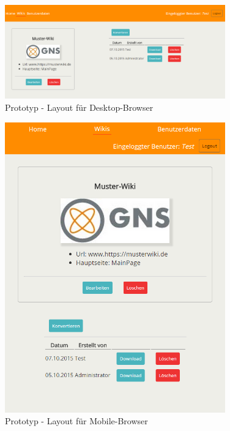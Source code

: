 \label{app:prototyp}
		
	\begin{figure}[H]
	\begin{center}
	\includegraphics[width=0.85\textwidth]{images/prototyp1}	
	\caption{Prototyp - Layout für Desktop-Browser}
	\end{center}
	\end{figure}
			
	\begin{figure}[H]
	\begin{center}
	\includegraphics[width=0.85\textwidth]{images/prototyp2}	
	\caption{Prototyp - Layout für Mobile-Browser}
	\end{center}
	\end{figure}
	